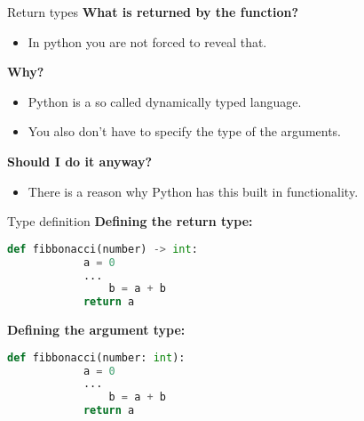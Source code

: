 \documentclass{beamer}
\begin{document}
\begin{frame}{Return types}
    \textbf{What is returned by the function?}\\ \pause
    \begin{itemize}
        \item In python you are not forced to reveal that.\\ \pause
    \end{itemize}
    \textbf{Why? }\\ \pause
    \begin{itemize}
        \item Python is a so called dynamically typed language.\\ \pause
        \item You also don't have to specify the type of the arguments.\\ \pause
    \end{itemize}
    \textbf{Should I do it anyway?}\\ \pause
    \begin{itemize}
        \item There is a reason why Python has this built in functionality.\\ \pause
    \end{itemize}
\end{frame}

\begin{frame}[fragile]{Type definition}
    \textbf{Defining the return type:}\\ \pause
    \begin{lstlisting}[backgroundcolor = \color{lightgray},language=Python]
        def fibbonacci(number) -> int:
            a = 0
            ...
                b = a + b
            return a
    \end{lstlisting} \pause
    \textbf{Defining the argument type:}\\ \pause
    \begin{lstlisting}[backgroundcolor = \color{lightgray},language=Python]
        def fibbonacci(number: int):
            a = 0
            ...
                b = a + b
            return a
    \end{lstlisting}
\end{frame}
\end{document}
